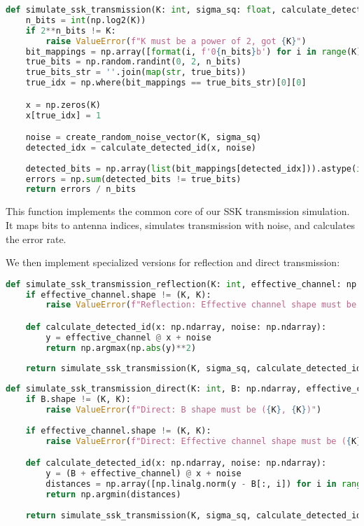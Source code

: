 \begin{lstlisting}[language=python, caption={SSK Transmission Simulation}]
def simulate_ssk_transmission(K: int, sigma_sq: float, calculate_detected_id: Callable[[np.ndarray, np.ndarray], float]):
    n_bits = int(np.log2(K))
    if 2**n_bits != K:
        raise ValueError(f"K must be a power of 2, got {K}")
    bit_mappings = np.array([format(i, f'0{n_bits}b') for i in range(K)])    
    true_bits = np.random.randint(0, 2, n_bits)
    true_bits_str = ''.join(map(str, true_bits))
    true_idx = np.where(bit_mappings == true_bits_str)[0][0]

    x = np.zeros(K)
    x[true_idx] = 1

    noise = create_random_noise_vector(K, sigma_sq)
    detected_idx = calculate_detected_id(x, noise)
    
    detected_bits = np.array(list(bit_mappings[detected_idx])).astype(int)
    errors = np.sum(detected_bits != true_bits)
    return errors / n_bits
\end{lstlisting}

This function implements the common core of our SSK transmission simulation. It maps bits to antenna indices, simulates transmission with noise, and calculates the error rate.

We then implement specialized versions for reflection and direct transmission:

\begin{lstlisting}[language=python, caption={SSK Transmission with Reflection}]
def simulate_ssk_transmission_reflection(K: int, effective_channel: np.ndarray, sigma_sq: float):
    if effective_channel.shape != (K, K):
        raise ValueError(f"Reflection: Effective channel shape must be ({K}, {K})")

    def calculate_detected_id(x: np.ndarray, noise: np.ndarray):
        y = effective_channel @ x + noise
        return np.argmax(np.abs(y)**2)
    
    return simulate_ssk_transmission(K, sigma_sq, calculate_detected_id)
\end{lstlisting}

\begin{lstlisting}[language=python, caption={SSK Transmission with Direct Path}]
def simulate_ssk_transmission_direct(K: int, B: np.ndarray, effective_channel: np.ndarray, sigma_sq: float):
    if B.shape != (K, K):
        raise ValueError(f"Direct: B shape must be ({K}, {K})")
    
    if effective_channel.shape != (K, K):
        raise ValueError(f"Direct: Effective channel shape must be ({K}, {K})")

    def calculate_detected_id(x: np.ndarray, noise: np.ndarray):
        y = (B + effective_channel) @ x + noise
        distances = np.array([np.linalg.norm(y - B[:, i]) for i in range(B.shape[1])])
        return np.argmin(distances)
    
    return simulate_ssk_transmission(K, sigma_sq, calculate_detected_id)
\end{lstlisting}

